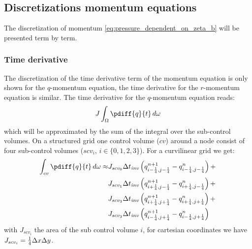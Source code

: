 \subsection{Discretizations momentum equations}
The discretization of momentum \autoref{eq:pressure_dependent_on_zeta_b} will be presented term by term.
\subsubsection{Time derivative}
The discretization of the time derivative term of the momentum equation is only shown for the $q$-momentum equation, the time derivative for the $r$-momentum equation is similar. The time derivative for the $q$-momentum equation reads:
\begin{align}
    J \int_{\Omega} \pdiff{q}{t}\, d\omega
\end{align}
which will be approximated by the sum of the integral over the sub-control volumes.
On a structured grid one control volume ($cv$) around a node consist of four sub-control volumes ($scv_i$, $i\in\{0,1,2,3\}$).
For a curvilinear grid we get:
\begin{align}
    \int_{cv} \pdiff{q}{t}\, d\omega \approx &
    J_{scv_0} \Dtinv \left( q^{n+1}_{i-\quart, j-\quart} -  q^{n}_{i-\quart, j-\quart} \right) +
    \nonumber \\*
    &J_{scv_1} \Dtinv \left( q^{n+1}_{i+\quart, j-\quart} -  q^{n}_{i+\quart, j-\quart} \right) +
    \nonumber \\*
    &J_{scv_3} \Dtinv \left( q^{n+1}_{i+\quart, j+\quart} -  q^{n}_{i+\quart, j+\quart} \right) +
    \nonumber \\*
    &J_{scv_3} \Dtinv \left( q^{n+1}_{i-\quart, j+\quart} -  q^{n}_{i-\quart, j+\quart} \right)
\end{align}
with $J_{scv_i}$ the area of the sub control volume $i$, for cartesian coordinates we have $J_{scv_i} = \frac{1}{4} \Delta x\Delta y$.

